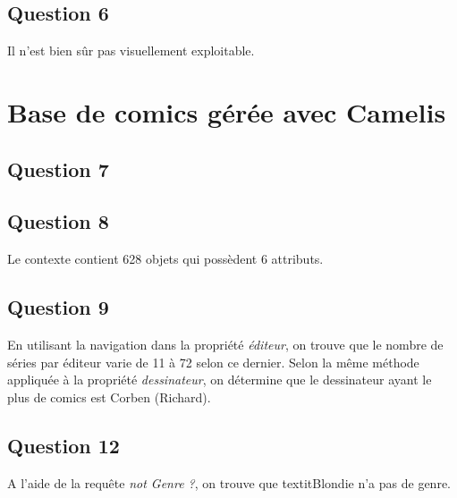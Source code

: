 \documentclass[a4paper,12pt]{article}
\begin{document}
\subsection{Question 6}
Il n'est bien sûr pas visuellement exploitable. %

\section{Base de comics gérée avec Camelis}
\subsection{Question 7}

\subsection{Question 8}
Le contexte contient 628 objets qui possèdent 6 attributs.

\subsection{Question 9}
En utilisant la navigation dans la propriété \textit{éditeur}, on trouve que le nombre de séries par éditeur varie de 11 à 72 selon ce dernier. Selon la même méthode appliquée à la propriété \textit{dessinateur}, on détermine que le dessinateur ayant le plus de comics est Corben (Richard).

\subsection{Question 12}
A l'aide de la requête \textit{not Genre ?}, on trouve que textit{Blondie} n'a pas de genre.
\end{document}
